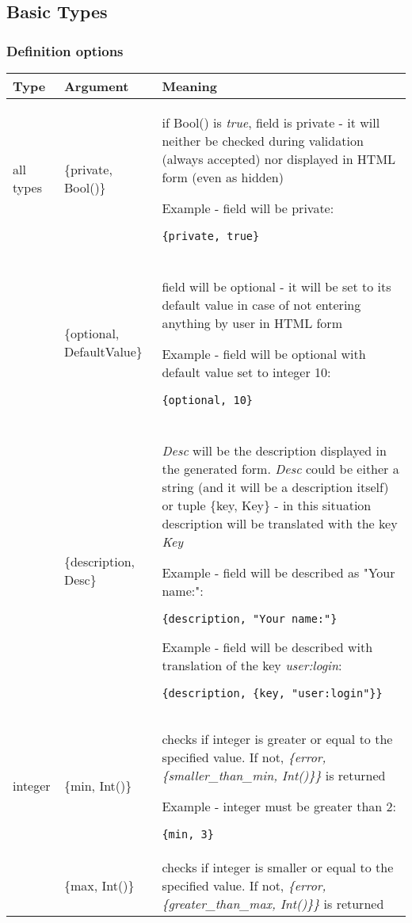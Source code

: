 \subsection{Basic Types}
\subsubsection{Definition options}
\begin{longtable}{|p{}|p{}|p{}|}
\hline
{\bf Type} & {\bf Argument} & {\bf Meaning} \\
\hline\hline
all types & \{private, Bool()\} & if Bool() is {\it true}, field is private - it will neither be checked during validation (always accepted) nor displayed in HTML form (even as hidden)

Example - field will be private:
\begin{verbatim}
{private, true}
\end{verbatim}\\ 
& & \\
& \{optional, DefaultValue\} & field will be optional - it will be set to its default value in case of not entering anything by user in HTML form

Example - field will be optional with default value set to integer 10:
\begin{verbatim}
{optional, 10}
\end{verbatim}\\
& & \\
& \{description, Desc\} & {\it Desc} will be the description displayed in the generated form. {\it Desc} could be either a string (and it will be a description itself) or tuple \{key, Key\} - in this situation description will be translated with the key {\it Key}

Example - field will be described as "Your name:":
\begin{verbatim}
{description, "Your name:"}
\end{verbatim}

Example - field will be described with translation of the key {\it user:login}:
\begin{verbatim}
{description, {key, "user:login"}}
\end{verbatim}\\
\hline
integer & \{min, Int()\} & checks if integer is greater or equal to the specified value. If not, {\it \{error, \{smaller\_than\_min, Int()\}\}} is returned

Example - integer must be greater than 2:
\begin{verbatim}
{min, 3}
\end{verbatim}\\
& \{max, Int()\} & checks if integer is smaller or equal to the specified value. If not, {\it \{error, \{greater\_than\_max, Int()\}\}} is returned


\end{longtable}
